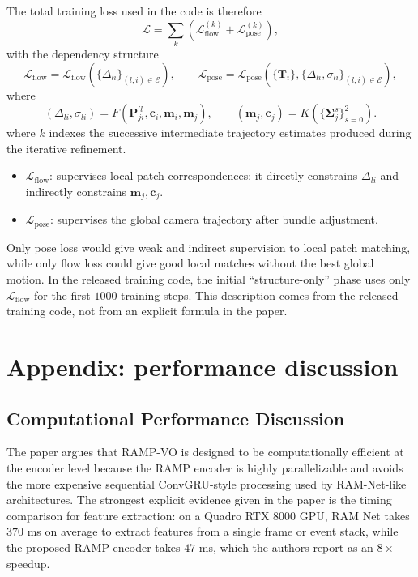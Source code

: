 \documentclass[11pt]{article}
\newcommand{\state}{\boldsymbol{\Sigma}}
\begin{document}
The total training loss used in the code is therefore
\begin{equation}
\mathcal{L} = \sum_{k}\left(\mathcal{L}_{\mathrm{flow}}^{(k)} + \mathcal{L}_{\mathrm{pose}}^{(k)}\right),
\end{equation}
with the dependency structure
\begin{equation}
\mathcal{L}_{\mathrm{flow}} = \mathcal{L}_{\mathrm{flow}}\!\left(\{\Delta_{li}\}_{(l,i)\in\mathcal{E}}\right),
\qquad
\mathcal{L}_{\mathrm{pose}} = \mathcal{L}_{\mathrm{pose}}\!\left(\{\mathbf{T}_i\},\{\Delta_{li},\sigma_{li}\}_{(l,i)\in\mathcal{E}}\right),
\end{equation}
where
\begin{equation}
(\Delta_{li},\sigma_{li}) = F(\mathbf{P}_{ji}^{\prime l},\mathbf{c}_i,\mathbf{m}_i,\mathbf{m}_j),
\qquad
(\mathbf{m}_j,\mathbf{c}_j)=K(\{\state_j^s\}_{s=0}^2).
\end{equation}
where \(k\) indexes the successive intermediate trajectory estimates produced during the iterative refinement.
\begin{itemize}
    \item \(\mathcal{L}_{\mathrm{flow}}\): supervises local patch correspondences; it directly constrains \(\Delta_{li}\) and indirectly constrains \(\mathbf{m}_j,\mathbf{c}_j\).
    \item \(\mathcal{L}_{\mathrm{pose}}\): supervises the global camera trajectory after bundle adjustment.
\end{itemize}
Only pose loss would give weak and indirect supervision to local patch matching, while only flow loss could give good local matches without the best global motion. In the released training code, the initial ``structure-only'' phase uses only \(\mathcal{L}_{\mathrm{flow}}\) for the first \(1000\) training steps.
This description comes from the released training code, not from an explicit formula in the paper.

\section{Appendix: performance discussion}

\subsection{Computational Performance Discussion}

The paper argues that RAMP-VO is designed to be computationally efficient at the encoder level because the RAMP encoder is highly parallelizable and avoids the more expensive sequential ConvGRU-style processing used by RAM-Net-like architectures. The strongest explicit evidence given in the paper is the timing comparison for feature extraction: on a Quadro RTX 8000 GPU, RAM Net takes \(370\) ms on average to extract features from a single frame or event stack, while the proposed RAMP encoder takes \(47\) ms, which the authors report as an \(8\times\) speedup.
\end{document}
